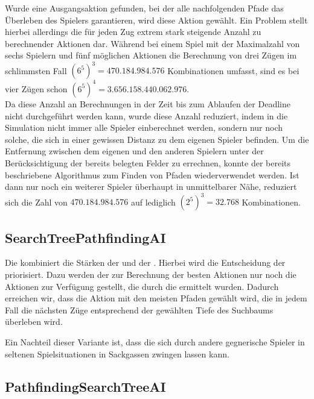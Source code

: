Wurde eine Ausgangsaktion gefunden, bei der alle nachfolgenden Pfade das Überleben des Spielers garantieren, wird
diese Aktion gewählt.
Ein Problem stellt hierbei allerdings die für jeden Zug extrem stark steigende Anzahl zu berechnender Aktionen dar.
Während bei einem Spiel mit der Maximalzahl von sechs Spielern und fünf möglichen Aktionen die Berechnung von drei Zügen
im schlimmsten Fall $(6 ^ 5) ^ 3 = 470.184.984.576$ Kombinationen umfasst, sind es bei vier Zügen schon
$(6 ^ 5) ^ 4 = 3.656.158.440.062.976$. \\

Da diese Anzahl an Berechnungen in der Zeit bis zum Ablaufen der Deadline nicht durchgeführt werden kann, wurde diese
Anzahl reduziert, indem in die Simulation nicht immer alle Spieler einberechnet werden, sondern nur noch solche,
die sich in einer gewissen Distanz zu dem eigenen Spieler befinden.
Um die Entfernung zwischen dem eigenen und den anderen Spielern unter der Berücksichtigung der bereits belegten Felder
zu errechnen, konnte der bereits beschriebene Algorithmus zum Finden von Pfaden wiederverwendet werden.
Ist dann \bspw nur noch ein weiterer Spieler überhaupt in unmittelbarer Nähe, reduziert sich die Zahl von
$470.184.984.576$ auf lediglich $(2 ^ 5) ^ 3 = 32.768$ Kombinationen.

\subsection{SearchTreePathfindingAI}
\label{subsec:searchtree-pathfinding-ai}

Die  kombiniert die Stärken der  und der .
Hierbei wird die Entscheidung der  priorisiert.
Dazu werden der  zur Berechnung der besten Aktionen nur noch die Aktionen zur Verfügung gestellt,
die durch die  ermittelt wurden.
Dadurch erreichen wir, dass die Aktion mit den meisten Pfaden gewählt wird, die in jedem Fall die nächsten Züge
entsprechend der gewählten Tiefe des Suchbaums überleben wird.

Ein Nachteil dieser Variante ist, dass die  sich durch andere gegnerische Spieler in
seltenen Spielsituationen in Sackgassen zwingen lassen kann.

\subsection{PathfindingSearchTreeAI}
\label{subsec:pathfinding-searchtree-ai}

